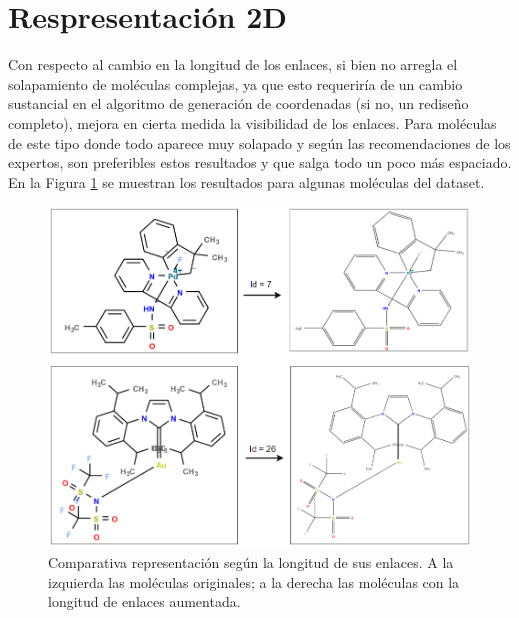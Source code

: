 \newpage

\section{Respresentación 2D}
Con respecto al cambio en la longitud de los enlaces, si bien no arregla el solapamiento de moléculas complejas, ya que esto requeriría de un cambio sustancial en el algoritmo de generación de coordenadas (si no, un rediseño completo), mejora en cierta medida la visibilidad de los enlaces. Para moléculas de este tipo donde todo aparece muy solapado y según las recomendaciones de los expertos, son preferibles estos resultados y que salga todo un poco más espaciado. En la Figura \ref{fig:bonds_longitud} se muestran los resultados para algunas moléculas del dataset.

\begin{figure}[h]
    \centering
    \includegraphics[scale=0.51]{imagenes/resultados/bond_longitud.png}
    \caption{Comparativa representación según la longitud de sus enlaces. A la izquierda las moléculas originales; a la derecha las moléculas con la longitud de enlaces aumentada.}
    \label{fig:bonds_longitud}
\end{figure}


